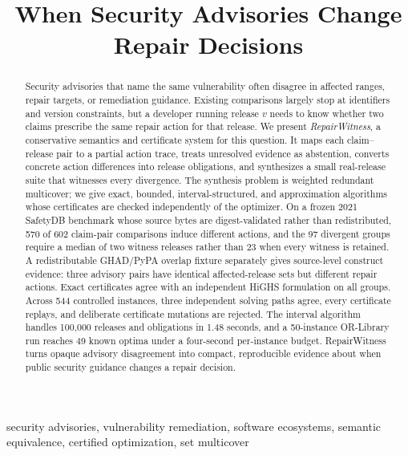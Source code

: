 \documentclass[10pt,conference]{IEEEtran}
\title{When Security Advisories Change Repair Decisions}
\author{\IEEEauthorblockN{Anonymous Author(s)}}
\begin{document}
\maketitle

\begin{abstract}
Security advisories that name the same vulnerability often disagree in affected ranges, repair targets, or remediation guidance. Existing comparisons largely stop at identifiers and version constraints, but a developer running release $v$ needs to know whether two claims prescribe the same repair action for that release. We present \emph{RepairWitness}, a conservative semantics and certificate system for this question. It maps each claim--release pair to a partial action trace, treats unresolved evidence as abstention, converts concrete action differences into release obligations, and synthesizes a small real-release suite that witnesses every divergence. The synthesis problem is weighted redundant multicover; we give exact, bounded, interval-structured, and approximation algorithms whose certificates are checked independently of the optimizer. On a frozen 2021 SafetyDB benchmark whose source bytes are digest-validated rather than redistributed, 570 of 602 claim-pair comparisons induce different actions, and the 97 divergent groups require a median of two witness releases rather than 23 when every witness is retained. A redistributable GHAD/PyPA overlap fixture separately gives source-level construct evidence: three advisory pairs have identical affected-release sets but different repair actions. Exact certificates agree with an independent HiGHS formulation on all groups. Across 544 controlled instances, three independent solving paths agree, every certificate replays, and deliberate certificate mutations are rejected. The interval algorithm handles 100,000 releases and obligations in 1.48 seconds, and a 50-instance OR-Library run reaches 49 known optima under a four-second per-instance budget. RepairWitness turns opaque advisory disagreement into compact, reproducible evidence about when public security guidance changes a repair decision.
\end{abstract}

\begin{IEEEkeywords}
security advisories, vulnerability remediation, software ecosystems, semantic equivalence, certified optimization, set multicover
\end{IEEEkeywords}
\end{document}
